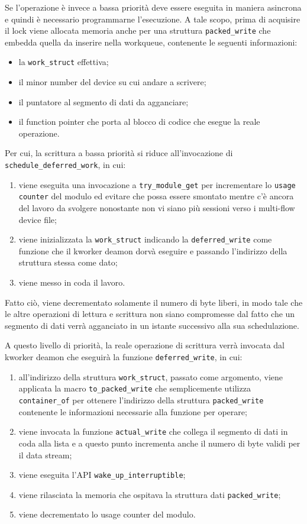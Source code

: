 \documentclass{article}
\begin{document}
Se l'operazione è invece a bassa priorità deve essere eseguita in maniera asincrona e quindi è necessario programmarne l'esecuzione. A tale scopo, prima di acquisire il lock viene allocata memoria anche per una struttura \texttt{packed\_write} che embedda quella da inserire nella workqueue, contenente le seguenti informazioni:
\begin{itemize}
\item la \texttt{work\_struct} effettiva;
\item il minor number del device su cui andare a scrivere;
\item il puntatore al segmento di dati da agganciare;
\item il function pointer che porta al blocco di codice che esegue la reale operazione.
\end{itemize}
Per cui, la scrittura a bassa priorità si riduce all'invocazione di \texttt{schedule\_deferred\_work}, in cui:
\begin{enumerate}
\item viene eseguita una invocazione a \texttt{try\_module\_get} per incrementare lo \texttt{usage counter} del modulo ed evitare che possa essere smontato mentre c'è ancora del lavoro da svolgere nonostante non vi siano più sessioni verso i multi-flow device file;
\item viene inizializzata la \texttt{work\_struct} indicando la \texttt{deferred\_write} come funzione che il kworker deamon dorvà eseguire e passando l'indirizzo della struttura stessa come dato;
\item viene messo in coda il lavoro.
\end{enumerate}
Fatto ciò, viene decrementato solamente il numero di byte liberi, in modo tale che le altre operazioni di lettura e scrittura non siano compromesse dal fatto che un segmento di dati verrà agganciato in un istante successivo alla sua schedulazione.

A questo livello di priorità, la reale operazione di scrittura verrà invocata dal kworker deamon che eseguirà la funzione \texttt{deferred\_write}, in cui:
\begin{enumerate}
\item all'indirizzo della struttura \texttt{work\_struct}, passato come argomento, viene applicata la macro \texttt{to\_packed\_write} che semplicemente utilizza \texttt{container\_of} per ottenere l'indirizzo della struttura \texttt{packed\_write} contenente le informazioni necessarie alla funzione per operare;
\item viene invocata la funzione \texttt{actual\_write} che collega il segmento di dati in coda alla lista e a questo punto incrementa anche il numero di byte validi per il data stream;
\item viene eseguita l'API \texttt{wake\_up\_interruptible};
\item viene rilasciata la memoria che ospitava la struttura dati \texttt{packed\_write};
\item viene decrementato lo usage counter del modulo.
\end{enumerate}
\end{document}
